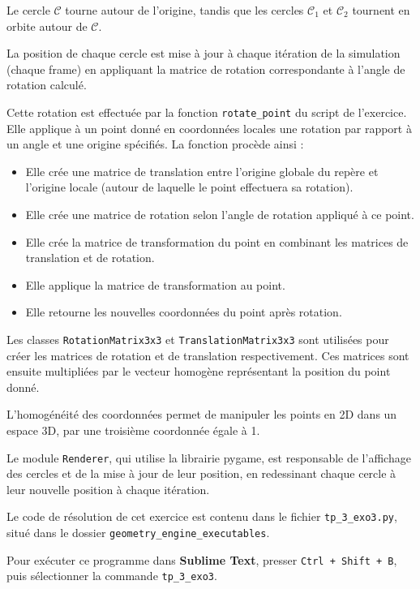 \documentclass[a4paper,12pt]{article}
\begin{document}
Le cercle $\mathcal{C}$ tourne autour de l'origine, tandis que les cercles $\mathcal{C}_1$ et $\mathcal{C}_2$ tournent en orbite autour de $\mathcal{C}$.

La position de chaque cercle est mise à jour à chaque itération de la simulation (chaque frame) en appliquant la matrice de rotation correspondante à l'angle de rotation calculé.

\pagebreak

Cette rotation est effectuée par la fonction \texttt{rotate\_point} du script de l'exercice. 
Elle applique à un point donné en coordonnées locales une rotation par rapport à un angle et une origine spécifiés. La fonction procède ainsi :

\begin{itemize}
    \item Elle crée une matrice de translation entre l'origine globale du repère et l'origine locale (autour de laquelle le point effectuera sa rotation).
    \item Elle crée une matrice de rotation selon l'angle de rotation appliqué à ce point.
    \item Elle crée la matrice de transformation du point en combinant les matrices de translation et de rotation.
    \item Elle applique la matrice de transformation au point.
    \item Elle retourne les nouvelles coordonnées du point après rotation.
\end{itemize}

Les classes \texttt{RotationMatrix3x3} et \texttt{TranslationMatrix3x3} sont utilisées pour créer les matrices de rotation et de translation respectivement. 
Ces matrices sont ensuite multipliées par le vecteur homogène représentant la position du point donné.

L'homogénéité des coordonnées permet de manipuler les points en 2D dans un espace 3D, par une troisième coordonnée égale à 1.

Le module \texttt{Renderer}, qui utilise la librairie pygame, est responsable de l'affichage des cercles et de la mise à jour de leur position, en redessinant chaque cercle à leur nouvelle position à chaque itération.

Le code de résolution de cet exercice est contenu dans le fichier \texttt{tp\_3\_exo3.py}, situé dans le dossier \texttt{geometry\_engine\_executables}.

Pour exécuter ce programme dans \textbf{Sublime Text}, presser \texttt{Ctrl + Shift + B}, puis sélectionner la commande \texttt{tp\_3\_exo3}.
\end{document}
